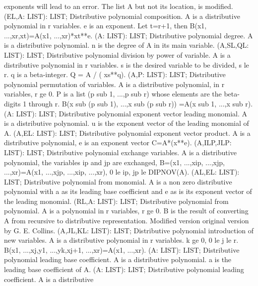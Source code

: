 exponents will lead to an error. The
list A but not its location, is modified. \ecom 
{} (EL,A: LIST): LIST; \eproc
\bcom Distributive polynomial composition. A is a distributive
polynomial in r variables. e is an exponent. Let t=r+1, then
B(x1, ...,xr,xt)=A(x1, ...,xr)*xt**e. \ecom 
{} (A: LIST): LIST; \eproc
\bcom Distributive polynomial degree. A is a distributive polynomial.
n is the degree of A in its main variable. \ecom 
{} (A,SL,QL: LIST): LIST; \eproc
\bcom Distributive polynomial division by power of variable. A is
a distributive polynomial in r variables. s is the desired
variable to be divided, s le r. q is a beta-integer.
Q = A / ( xs**q).  \ecom 
{} (A,P: LIST): LIST; \eproc
\bcom Distributive polynomial permutation of variables. A is a
distributive polynomial, in r variables, r ge 0. P is a
list (p sub 1, ...,p sub r) whose elements are the
beta-digits 1 through r.  B(x sub (p sub 1), ...,x sub (p sub r))
=A(x sub 1, ...,x sub r).  \ecom 
{} (A: LIST): LIST; \eproc
\bcom Distributive polynomial exponent vector leading monomial.
A is a distributive polynomial. u is the exponent vector of
the leading monomial of A.  \ecom 
{} (A,EL: LIST): LIST; \eproc
\bcom Distributive polynomial exponent vector product. A is a
distributive polynomial, e is an exponent vector C=A*(x**e).  \ecom 
{} (A,ILP,JLP: LIST): LIST; \eproc
\bcom Distributive polynomial exchange variables. A is a
distributive polynomial, the variables ip and jp are exchanged,
B=(x1, ...,xip, ...,xjp, ...,xr)=A(x1, ...,xjp, ...,xip, ...,xr), 
0 le ip, jp le DIPNOV(A). \ecom 
{} (AL,EL: LIST): LIST; \eproc
\bcom Distributive polynomial from monomial. A is a non zero
distributive polynomial with a as its leading base coefficient
and e as is its exponent vector of the leading monomial.  \ecom 
{} (RL,A: LIST): LIST; \eproc
\bcom Distributive polynomial from polynomial. A is a polynomial
in r variables, r ge 0. B is the result of converting A from
recursive to distributive representation. Modified version
original version by G. E. Collins.  \ecom 
{} (A,JL,KL: LIST): LIST; \eproc
\bcom Distributive polynomial introduction of new variables.
A is a distributive polynomial in r variables. k ge 0,
0 le j le r. B(x1, ...,xj,y1, ...,yk,xj+1, ...,xr)=A(x1, ...,xr). \ecom 
{} (A: LIST): LIST; \eproc
\bcom Distributive polynomial leading base coefficient. A is a
distributive polynomial. a is the leading base coefficient of A. \ecom 
{} (A: LIST): LIST; \eproc
\bcom Distributive polynomial leading coefficient. A is a distributive
